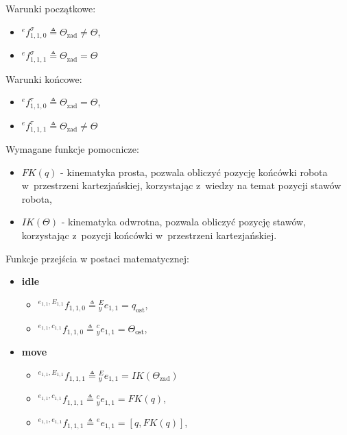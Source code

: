 Warunki początkowe:
\begin{itemize}
    \item ${}^{e}f^{\sigma}_{1,1,0} \triangleq \Theta_{\mathrm{zad}} \neq \Theta$,
    \item ${}^{e}f^{\sigma}_{1,1,1} \triangleq \Theta_{\mathrm{zad}} = \Theta$
\end{itemize}

Warunki końcowe:
\begin{itemize}
    \item ${}^{e}f^{\tau}_{1,1,0} \triangleq \Theta_{\mathrm{zad}} = \Theta$,
    \item ${}^{e}f^{\tau}_{1,1,1} \triangleq \Theta_{\mathrm{zad}} \neq \Theta$
\end{itemize}

Wymagane funkcje pomocnicze:
\begin{itemize}
    \item $FK(q)$ - kinematyka prosta, pozwala obliczyć pozycję końcówki robota w~przestrzeni kartezjańskiej, korzystając z~wiedzy na temat pozycji stawów robota,
    \item $IK(\Theta)$ - kinematyka odwrotna, pozwala obliczyć pozycję stawów, korzystając z~pozycji końcówki w~przestrzeni kartezjańskiej.
\end{itemize}

Funkcje przejścia w postaci matematycznej:
\begin{itemize}
    \item \textbf{idle} \begin{itemize}
        \item ${}^{e_{1,1}, E_{1,1}}f_{1,1,0} \triangleq {}^{E}_{y}e_{1,1} = q_{\mathrm{ost}}$,
        \item ${}^{e_{1,1}, c_{1,1}}f_{1,1,0} \triangleq {}^{c}_{y}e_{1,1} = \Theta_{\mathrm{ost}}$,
    \end{itemize} 
    \item \textbf{move} \begin{itemize}
        \item ${}^{e_{1,1}, E_{1,1}}f_{1,1,1} \triangleq {}^{E}_{y}e_{1,1} = IK(\Theta_{\mathrm{zad}})$
        \item ${}^{e_{1,1}, c_{1,1}}f_{1,1,1} \triangleq {}^{c}_{y}e_{1,1} = FK(q)$,
        \item ${}^{e_{1,1}, e_{1,1}}f_{1,1,1} \triangleq {}^{e}e_{1,1} = [q, FK(q)]$,
    \end{itemize}
\end{itemize}

